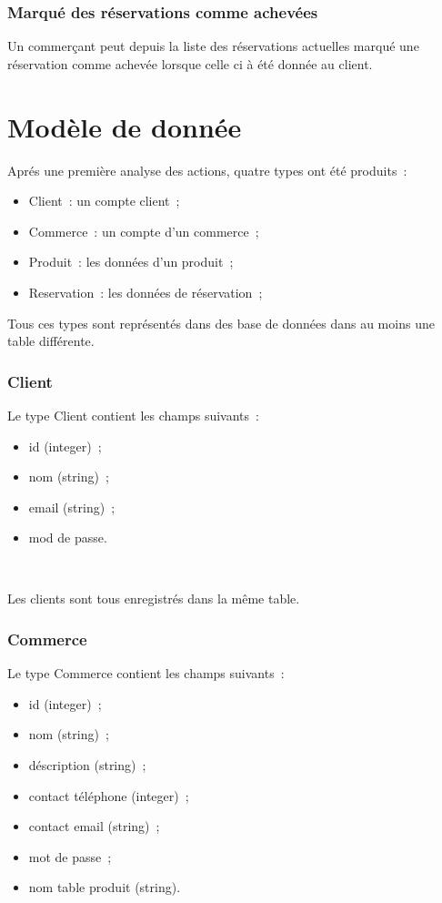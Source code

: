 \documentclass[a4paper,12pt]{article}
\begin{document}
\subsubsection{Marqué des réservations comme achevées}

Un commerçant peut depuis la liste des réservations actuelles marqué une réservation comme achevée lorsque celle ci à été donnée au client.

\section{Modèle de donnée}

Aprés une première analyse des actions, quatre types ont été produits~:
\begin{itemize}
	\item Client~: un compte client~;
	\item Commerce~: un compte d'un commerce~;
	\item Produit~: les données d'un produit~;
	\item Reservation~: les données de réservation~;
\end{itemize}

Tous ces types sont représentés dans des base de données dans au moins une table différente.

\subsubsection{Client}

Le type Client contient les champs suivants~:
\begin{itemize}
	\item id (integer)~;
	\item nom (string)~;
	\item email (string)~;
	\item mod de passe.
\end{itemize} \

Les clients sont tous enregistrés dans la même table.

\subsubsection{Commerce}

Le type Commerce contient les champs suivants~:
\begin{itemize}
	\item id (integer)~;
	\item nom (string)~;
	\item déscription (string)~;
	\item contact téléphone (integer)~;
	\item contact email (string)~;
	\item mot de passe~;
	\item nom table produit (string).
\end{itemize} \
\end{document}
